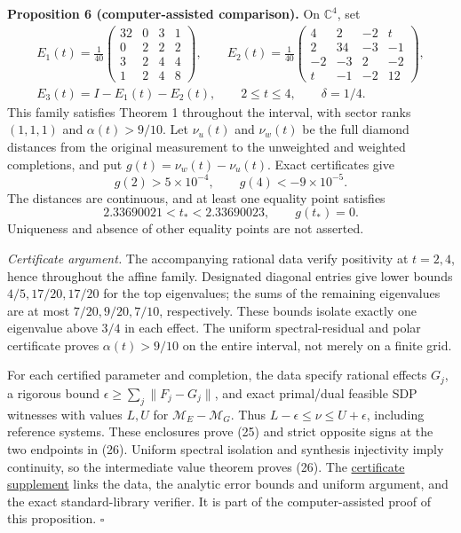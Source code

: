 \documentclass[
  11pt,
  a4paper,
]{article}
\begin{document}
\textbf{Proposition 6 (computer-assisted comparison).} On
\(\mathbb C^4\), set \[\begin{gathered}
E_1(t)=\frac1{40}\begin{pmatrix}
32&0&3&1\\0&2&2&2\\3&2&4&4\\1&2&4&8
\end{pmatrix},\qquad
E_2(t)=\frac1{40}\begin{pmatrix}
4&2&-2&t\\2&34&-3&-1\\-2&-3&2&-2\\t&-1&-2&12
\end{pmatrix},\\
E_3(t)=I-E_1(t)-E_2(t),\qquad 2\le t\le4,\qquad\delta=1/4.
\end{gathered}
\tag{24}\] This family satisfies Theorem 1 throughout the interval, with
sector ranks \((1,1,1)\) and \(\alpha(t)>9/10\). Let \(\nu_u(t)\) and
\(\nu_w(t)\) be the full diamond distances from the original measurement
to the unweighted and weighted completions, and put
\(g(t)=\nu_w(t)-\nu_u(t)\). Exact certificates give
\[g(2)>5\times10^{-4},\qquad g(4)<-9\times10^{-5}.
\tag{25}\] The distances are continuous, and at least one equality point
satisfies \[2.33690021<t_*<2.33690023,\qquad g(t_*)=0.
\tag{26}\] Uniqueness and absence of other equality points are not
asserted.

\emph{Certificate argument.} The accompanying rational data verify
positivity at \(t=2,4\), hence throughout the affine family. Designated
diagonal entries give lower bounds \(4/5,17/20,17/20\) for the top
eigenvalues; the sums of the remaining eigenvalues are at most
\(7/20,9/20,7/10\), respectively. These bounds isolate exactly one
eigenvalue above \(3/4\) in each effect. The uniform spectral-residual
and polar certificate proves \(\alpha(t)>9/10\) on the entire interval,
not merely on a finite grid.

For each certified parameter and completion, the data specify rational
effects \(G_j\), a rigorous bound \(\epsilon\ge\sum_j\|F_j-G_j\|\), and
exact primal/dual feasible SDP witnesses with values \(L,U\) for
\(\mathcal M_E-\mathcal M_G\). Thus \(L-\epsilon\le\nu\le U+\epsilon\),
including reference systems. These enclosures prove (25) and strict
opposite signs at the two endpoints in (26). Uniform spectral isolation
and synthesis injectivity imply continuity, so the intermediate value
theorem proves (26). The
\href{https://github.com/christophergardner-star/RC-Discovery/blob/d706872d89503f5c6f9e59d8f91b518bec9991b1/research/COMPLETION_CROSSOVER_2026-11-01.md}{certificate
supplement} links the data, the analytic error bounds and uniform
argument, and the exact standard-library verifier. It is part of the
computer-assisted proof of this proposition. \(\square\)
\end{document}
